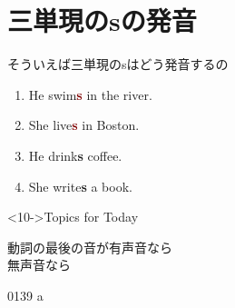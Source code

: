 \documentclass[aspectratio=169,xcolor={dvipsnames,table}]{beamer}
\newcommand{\myaudio}[1]{\href{#1}{\faVolumeUp}}
\begin{document}
\section{三単現のsの発音}
\begin{frame}[plain]{そういえば三単現のsはどう発音するの}
  \Large
  \begin{enumerate}
    \item<1-> He swim\textbf<2->{\textcolor<2->{Maroon}{s}} in the river. \hfill{}\hspace{110pt}\mbox{}
    \item<1-> She live\textbf<3->{\textcolor<3->{Maroon}{s}} in Boston. \hfill{}\hspace{110pt}\mbox{}
    \item<1-> He drink\textbf<4->{\textcolor<4->{NavyBlue}{s}} coffee. \hfill{}\hspace{110pt}\mbox{}
    \item<1-> She write\textbf<5->{\textcolor<5->{NavyBlue}{s}} a book. \hfill{}\hspace{110pt}\mbox{}

  \end{enumerate}

  \normalsize
  \begin{block}<10->{Topics for Today}
    \begin{description}[三単現のsの発音]
      \item[三単現のsの発音]
            動詞の最後の音が有声音なら\\
            \phantom{動詞の最後の音が}無声音なら\,\dbend\\
            \mbox{}
    \end{description}
  \end{block}
  {\tiny 0139}\,{\scriptsize \myaudio{./audio/005_singular_plural_a.mp3}}\,{\tiny a}\hfill{}
\end{frame}

\end{document}
